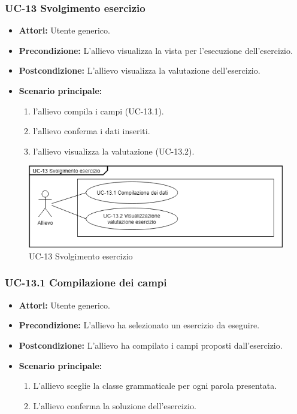 	\subsubsection{UC-13 Svolgimento esercizio}
	\begin{itemize}
			\item \textbf{Attori:} Utente generico.
			\item \textbf{Precondizione:}  L'allievo visualizza la vista per l'esecuzione dell'esercizio.
			\item \textbf{Postcondizione:} L'allievo visualizza la valutazione dell'esercizio.
			\item \textbf{Scenario principale:}
			\begin{enumerate}
				\item l'allievo compila i campi (UC-13.1).
				\item l'allievo conferma i dati inseriti.
				\item l'allievo visualizza la valutazione (UC-13.2).
			\end{enumerate}
	\end{itemize}
			
			\begin{figure}[h]
		\centering
		\includegraphics[scale=0.7]{images/UC-13.png}
		\caption{UC-13 Svolgimento esercizio}
	\end{figure}

	\subsubsection{UC-13.1 Compilazione dei campi}
		\begin{itemize}
			\item \textbf{Attori:} Utente generico.
			\item \textbf{Precondizione:} L'allievo ha selezionato un esercizio da eseguire.
			\item \textbf{Postcondizione:} L'allievo ha compilato i campi proposti dall'esercizio.
			\item \textbf{Scenario principale:}
				\begin{enumerate}
					\item L'allievo sceglie la classe grammaticale per ogni parola presentata.
					\item L'allievo conferma la soluzione dell'esercizio.
				\end{enumerate}
		\end{itemize}

